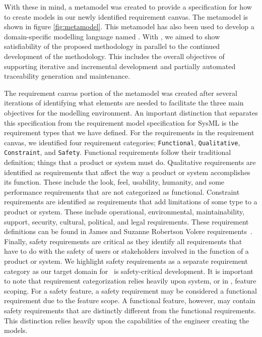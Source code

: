 With these in mind, a metamodel was created to provide a specification for how to create models in our newly identified requirement canvas. The metamodel is shown in figure \ref{fig:metamodel}. This metamodel has also been used to develop a domain-specific modelling language named \tool. With \tool, we aimed to show satisfiability of the proposed methodology in parallel to the continued development of the methodology. This includes the overall objectives of supporting iterative and incremental development and partially automated traceability generation and maintenance.


The requirement canvas portion of the metamodel was created after several iterations of identifying what elements are needed to facilitate the three main objectives for the modelling environment. An important distinction that separates this specification from the requirement model specification for SysML is the requirement types that we have defined. For the requirements in the requirement canvas, we identified four requirement categories; \texttt{Functional}, \texttt{Qualitative}, \texttt{Constraint}, and \texttt{Safety}. Functional requirements follow their traditional definition; things that a product or system must do. Qualitative requirements are identified as requirements that affect the way a product or system accomplishes its function. These include the look, feel, usability, humanity, and some performance requirements that are not categorized as functional. Constraint requirements are identified as requirements that add limitations of some type to a product or system. These include operational, environmental, maintainability, support, security, cultural, political, and legal requirements. These requirement definitions can be found in James and Suzanne Robertson Volere requirements~\cite{robertson2000volere}. Finally, safety requirements are critical as they identify all requirements that have to do with the safety of users or stakeholders involved in the function of a product or system. We highlight safety requirements as a separate requirement category as our target domain for \tool\ is safety-critical development. It is important to note that requirement categorization relies heavily upon system, or in \tool, feature scoping. For a safety feature, a safety requirement may be considered a functional requirement due to the feature scope. A functional feature, however, may contain safety requirements that are distinctly different from the functional requirements. This distinction relies heavily upon the capabilities of the engineer creating the models.

